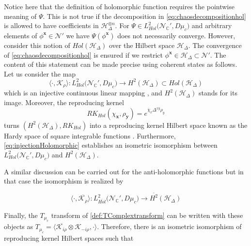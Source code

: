 \documentclass{elsarticle}%
\begin{document}
    
   Notice here that the definition of holomorphic function  requires the pointwise meaning of $\Psi$.  This is not true if the decomposition in \eqref{eq:chaosdecompositionhol} is allowed to have coefficients in $\mathcal{H}_\Delta^{\otimes n}$. For $\Psi\in L^2_{Hol}\big({\mathcal{N}_{\mathbb{C}}'},D\mu_c\big)$ and arbitrary elements of $\phi^{\mathbf{x}}\in \mathcal{N}'$ we have $\Psi(\phi^{\mathbf{x}})$ does not necessarily converge. However, consider this notion of  $Hol(\mathcal{H}_\Delta)$ over the Hilbert space $\mathcal{H}_\Delta$.  The  convergence of \eqref{eq:chaosdecompositionhol} is ensured if we restrict $\phi^{\mathbf{x}}\in \mathcal{H}_\Delta\subset \mathcal{N}'$. The content of this statement can be made precise using coherent states as follows. Let us consider  the map  
\begin{equation}
\label{eq:injectionHolomorphic}
\langle\cdot, \mathcal{K}_{\rho}\rangle: L^2_{Hol}\big({\mathcal{N}_{\mathbb{C}}'},D\mu_c\big) \to H^2(\mathcal{H}_\Delta)\subset Hol(\mathcal{H}_\Delta) 
\end{equation}
which is an injective continuous linear mapping \cite{oecklHolomorphicQuantization2012}, and $H^2(\mathcal{H}_\Delta)$ stands for its image. Moreover, the reproducing kernel 
\begin{equation}
\label{eq:kernel}
RK_{Hol}(\chi_{\mathbf{x}},\rho_\mathbf{y})=e^{\overline{\chi}_x\Delta^{xy}\rho_y}
\end{equation}
turns  $(H^2(\mathcal{H}_\Delta),RK_{Hol})$ into a reproducing kernel Hilbert space   known as the Hardy space of square integrable functions   . Furthermore, \eqref{eq:injectionHolomorphic} establishes an isometric isomorphism between $L^2_{Hol}\big({\mathcal{N}_{\mathbb{C}}'},D\mu_c\big)$ and $H^2(\mathcal{H}_\Delta)$.

A similar discussion can be carried out for the anti-holomorphic functions but in that case the isomorphism is realized by 

\begin{equation}
\label{eq:injectionAntiHolomorphic}
\langle \cdot ,\overline{\mathcal{K}_{\rho}}\rangle: L^2_{\overline{Hol}}\big({\mathcal{N}_{\mathbb{C}}'},D\mu_c\big) \to \overline{H^2}(\mathcal{H}_\Delta)
\end{equation}

Finally, the $T_{\mu_c}$ transform of \autoref{def:TComplextransform}  can be written with these objects as  $T_{\mu_c}=\langle \overline{\mathcal{K}_{i\rho}}\otimes \mathcal{K}_{-i\rho} , \cdot\rangle$. Therefore, there is an isometric isomorphism of reproducing kernel Hilbert spaces such that
\end{document}
